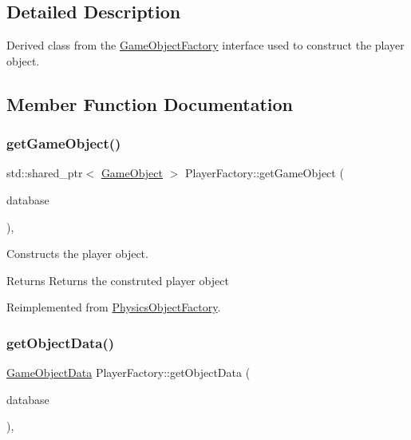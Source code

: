 \subsection{Detailed Description}
Derived class from the \hyperlink{class_game_object_factory}{Game\+Object\+Factory} interface used to construct the player object. 

\subsection{Member Function Documentation}
\mbox{\label{class_player_factory_ab92534e7d2d6887ecf9e4ed8131a8112}} 
\subsubsection{\texorpdfstring{get\+Game\+Object()}{getGameObject()}}
{\footnotesize\ttfamily std\+::shared\+\_\+ptr$<$ \hyperlink{class_game_object}{Game\+Object} $>$ Player\+Factory\+::get\+Game\+Object (\begin{DoxyParamCaption}\item[{const std\+::shared\+\_\+ptr$<$ \hyperlink{class_database_interface}{Database\+Interface} $>$ \&}]{database }\end{DoxyParamCaption})\hspace{0.3cm}{\ttfamily [override]}, {\ttfamily [virtual]}}



Constructs the player object. 

\begin{DoxyReturn}{Returns}
Returns the construted player object 
\end{DoxyReturn}


Reimplemented from \hyperlink{class_physics_object_factory_a2644107d0c455c3307559cd824a7c9a8}{Physics\+Object\+Factory}.

\mbox{\label{class_player_factory_aca4e809430541d77acd4c588c4381715}} 
\subsubsection{\texorpdfstring{get\+Object\+Data()}{getObjectData()}}
{\footnotesize\ttfamily \hyperlink{struct_game_object_data}{Game\+Object\+Data} Player\+Factory\+::get\+Object\+Data (\begin{DoxyParamCaption}\item[{const std\+::shared\+\_\+ptr$<$ \hyperlink{class_database_interface}{Database\+Interface} $>$ \&}]{database }\end{DoxyParamCaption})\hspace{0.3cm}{\ttfamily [override]}, {\ttfamily [virtual]}}



